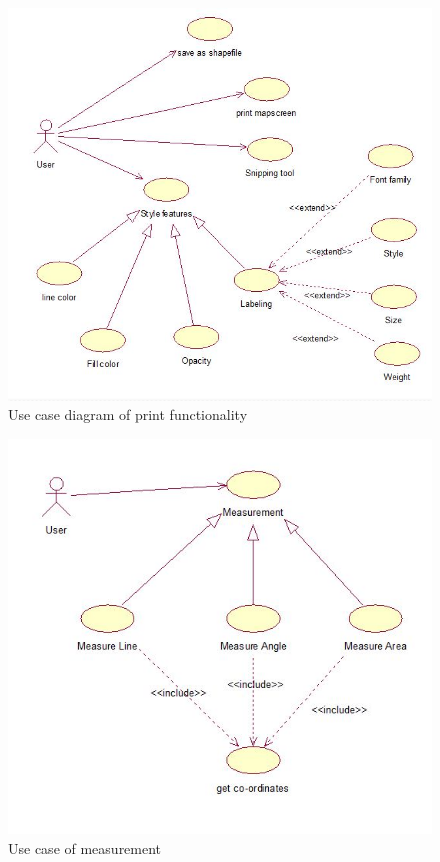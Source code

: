 \begin{figure}[h]
\begin{center}
  \includegraphics [scale=0.8] {Print.jpg}
  \caption[Use Case - Print]{Use case diagram of print functionality}
\end{center}
\end{figure}
\begin{figure}[h]
\begin{center}
  \includegraphics [scale=0.7] {Measure.jpg}
  \caption[Use Case - Measure]{Use case of measurement}
\end{center}
\end{figure}
